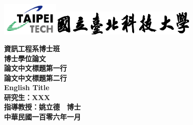 \noindent\hspace*{.1cm}\includegraphics[width=0.207\textwidth]{Logo.png}\hspace{1.15cm}\includegraphics[width=0.53\textwidth]{school_name.png}
\begin{center}
\begin{spacing}{1}
	\fontsize{24pt}{36pt}\selectfont 
	\bf 資訊工程系博士班\\
	博士學位論文\\
	\vspace{95pt}					%
	\fontsize{24pt}{32pt}\selectfont 
	\bf 論文中文標題第一行\\論文中文標題第二行\\	
	\fontsize{22pt}{32pt}\selectfont 
	English Title\\
	\vspace{140pt}					%
	\fontsize{18pt}{18pt}\selectfont
	\bf 研究生：XXX\\
	\vspace{72pt}					%
	\bf 指導教授：姚立德　博士\\	
	\vspace{54pt}					%
	\bf 中華民國一百零六年一月
\end{spacing}
\end{center}